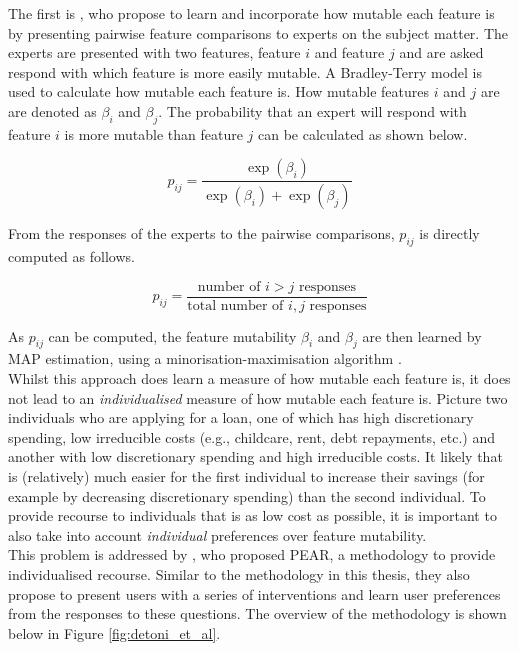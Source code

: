The first is \textcite{rawalIndividualizedRecourseInterpretable2020}, who propose to learn and incorporate how mutable each feature is by presenting pairwise feature comparisons to experts on the subject matter. The experts are presented with two features, feature $i$ and feature $j$ and are asked respond with which feature is more easily mutable. A Bradley-Terry model is used to calculate how mutable each feature is. How mutable features $i$ and $j$ are are denoted as $\beta_i$ and $\beta_j$. The probability that an expert will respond with feature $i$ is more mutable than feature $j$ can be calculated as shown below.

\begin{equation}
	p_{ij} = \frac{\exp(\beta_i)}{\exp(\beta_i) + \exp(\beta_j)}
\end{equation}

From the responses of the experts to the pairwise comparisons, $p_{ij}$ is directly computed as follows. 

\begin{equation}
	p_{ij} = \frac{\text{number of } i>j \text{ responses}}{\text{total number of } i, j \text{ responses}}
\end{equation}

As $p_{ij}$ can be computed, the feature mutability $\beta_i$ and $\beta_j$ are then learned by MAP estimation, using a minorisation-maximisation algorithm \citep{caronEfficientBayesianInference2012}.\\

Whilst this approach does learn a measure of how mutable each feature is, it does not lead to an \textit{individualised} measure of how mutable each feature is. Picture two individuals who are applying for a loan, one of which has high discretionary spending, low irreducible costs (e.g., childcare, rent, debt repayments, etc.) and another with low discretionary spending and high irreducible costs. It likely that is (relatively) much easier for the first individual to increase their savings (for example by decreasing discretionary spending) than the second individual. To provide recourse to individuals that is as low cost as possible, it is important to also take into account \textit{individual} preferences over feature mutability.\\


This problem is addressed by \textcite{detoniPersonalizedAlgorithmicRecourse2023}, who proposed PEAR, a methodology to provide individualised recourse. Similar to the methodology in this thesis, they also propose to present users with a series of interventions and learn user preferences from the responses to these questions. The overview of the methodology is shown below in Figure \ref{fig:detoni_et_al}.\\

